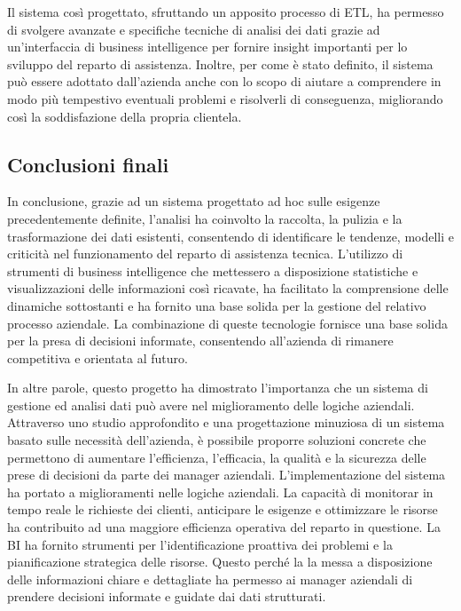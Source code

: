 Il sistema così progettato, sfruttando un apposito processo di ETL, ha permesso di svolgere avanzate e specifiche tecniche di analisi dei dati grazie ad un'interfaccia di business intelligence per fornire insight importanti per lo sviluppo del reparto di assistenza. Inoltre, per come è stato definito, il sistema può essere adottato dall'azienda anche con lo scopo di aiutare a comprendere in modo più tempestivo eventuali problemi e risolverli di conseguenza, migliorando così la soddisfazione della propria clientela.

\subsection{Conclusioni finali}

In conclusione, grazie ad un sistema progettato ad hoc sulle esigenze precedentemente definite, l'analisi ha coinvolto la raccolta, la pulizia e la trasformazione dei dati esistenti, consentendo di identificare le tendenze, modelli e criticità nel funzionamento del reparto di assistenza tecnica. L'utilizzo di strumenti di business intelligence che mettessero a disposizione statistiche e visualizzazioni delle informazioni così ricavate, ha facilitato la comprensione delle dinamiche sottostanti e ha fornito una base solida per la gestione del relativo processo aziendale. La combinazione di queste tecnologie fornisce una base solida per la presa di decisioni informate, consentendo all'azienda di rimanere competitiva e orientata al futuro.

In altre parole, questo progetto ha dimostrato l'importanza che un sistema di gestione ed analisi dati può avere nel miglioramento delle logiche aziendali. Attraverso uno studio approfondito e una progettazione minuziosa di un sistema basato sulle necessità dell'azienda, è possibile proporre soluzioni concrete che permettono di aumentare l'efficienza, l'efficacia, la qualità e la sicurezza delle prese di decisioni da parte dei manager aziendali. L'implementazione del sistema ha portato a miglioramenti nelle logiche aziendali. La capacità di monitorar in tempo reale le richieste dei clienti, anticipare le esigenze e ottimizzare le risorse ha contribuito ad una maggiore efficienza operativa del reparto in questione. La BI ha fornito strumenti per l'identificazione proattiva dei problemi e la pianificazione strategica delle risorse. Questo perché la la messa a disposizione delle informazioni chiare e dettagliate ha permesso ai manager aziendali di prendere decisioni informate e guidate dai dati strutturati.

